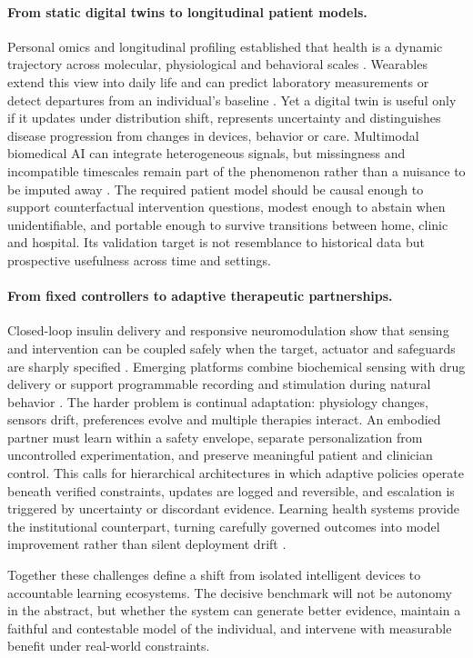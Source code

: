 \paragraph{From static digital twins to longitudinal patient models.}
Personal omics and longitudinal profiling established that health is a dynamic trajectory across molecular, physiological and behavioral scales \cite{Chen2012PersonalOmics,SchuesslerFiorenzaRose2019LongitudinalBigData,Zhou2019LongitudinalMultiOmics}. Wearables extend this view into daily life and can predict laboratory measurements or detect departures from an individual's baseline \cite{Dunn2021WearablePredictions,Mishra2020SmartwatchCOVID}. Yet a digital twin is useful only if it updates under distribution shift, represents uncertainty and distinguishes disease progression from changes in devices, behavior or care. Multimodal biomedical AI can integrate heterogeneous signals, but missingness and incompatible timescales remain part of the phenomenon rather than a nuisance to be imputed away \cite{Acosta2022MultimodalBiomedicalAI,Katsoulakis2024DigitalTwins}. The required patient model should be causal enough to support counterfactual intervention questions, modest enough to abstain when unidentifiable, and portable enough to survive transitions between home, clinic and hospital. Its validation target is not resemblance to historical data but prospective usefulness across time and settings.

\paragraph{From fixed controllers to adaptive therapeutic partnerships.}
Closed-loop insulin delivery and responsive neuromodulation show that sensing and intervention can be coupled safely when the target, actuator and safeguards are sharply specified \cite{Brown2019ClosedLoopDiabetes,Scangos2021ClosedLoopNeuromodulation,FDA2023PhysiologicClosedLoop}. Emerging platforms combine biochemical sensing with drug delivery or support programmable recording and stimulation during natural behavior \cite{Lee2016GrapheneMicroneedles,Topalovic2023ClosedLoopWearable}. The harder problem is continual adaptation: physiology changes, sensors drift, preferences evolve and multiple therapies interact. An embodied partner must learn within a safety envelope, separate personalization from uncontrolled experimentation, and preserve meaningful patient and clinician control. This calls for hierarchical architectures in which adaptive policies operate beneath verified constraints, updates are logged and reversible, and escalation is triggered by uncertainty or discordant evidence. Learning health systems provide the institutional counterpart, turning carefully governed outcomes into model improvement rather than silent deployment drift \cite{McDonald2024LearningHealthSystem}.

Together these challenges define a shift from isolated intelligent devices to accountable learning ecosystems. The decisive benchmark will not be autonomy in the abstract, but whether the system can generate better evidence, maintain a faithful and contestable model of the individual, and intervene with measurable benefit under real-world constraints.

